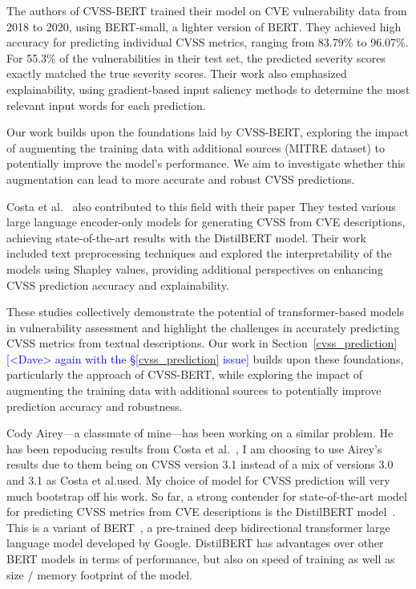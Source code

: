 \documentclass[12pt]{article}
\newcommand{\note}[2][red]{\textcolor{#1}{#2}}
\newcommand{\notedme}[1]{\note[blue]{[<Dave> #1]}}
\begin{document}
The authors of CVSS-BERT trained their model on CVE vulnerability data from 2018 to 2020, using
BERT-small, a lighter version of BERT. They achieved high accuracy for predicting individual CVSS
metrics, ranging from 83.79\% to 96.07\%. For 55.3\% of the vulnerabilities in their test set, the
predicted severity scores exactly matched the true severity scores. Their work also emphasized
explainability, using gradient-based input saliency methods to determine the most relevant input
words for each prediction.

Our work builds upon the foundations laid by CVSS-BERT, exploring the impact of augmenting the
training data with additional sources (MITRE dataset) to potentially improve the model's
performance. We aim to investigate whether this augmentation can lead to more accurate and robust
CVSS predictions.

Costa et al.~\cite{costa} also contributed to this field with their paper  They tested various large language encoder-only models for
generating CVSS from CVE descriptions, achieving state-of-the-art results with the DistilBERT model.
Their work included text preprocessing techniques and explored the interpretability of the models
using Shapley values, providing additional perspectives on enhancing CVSS prediction accuracy and
explainability.

These studies collectively demonstrate the potential of transformer-based models in vulnerability
assessment and highlight the challenges in accurately predicting CVSS metrics from textual
descriptions. Our work in Section~\ref{cvss_prediction}\notedme{again with the \S\ref{cvss_prediction} issue} builds upon these foundations, particularly
the approach of CVSS-BERT, while exploring the impact of augmenting the training data with
additional sources to potentially improve prediction accuracy and robustness.

Cody Airey---a classmate of mine---has been working on a similar problem. He has been repoducing
results from Costa et al.\@~\cite{costa}, I am choosing to use Airey's results due to them being on
CVSS version 3.1 instead of a mix of versions 3.0 and 3.1 as Costa et al.\@ used. My choice of model
for CVSS prediction will very much bootstrap off his work. So far, a strong contender for
state-of-the-art model for predicting CVSS metrics from CVE descriptions is the DistilBERT
model~\cite{distilbert}. This is a variant of BERT~\cite{BERT}, a pre-trained deep bidirectional
transformer large language model developed by Google. DistilBERT has advantages over other BERT
models in terms of performance, but also on speed of training as well as size / memory footprint of
the model.
\end{document}
